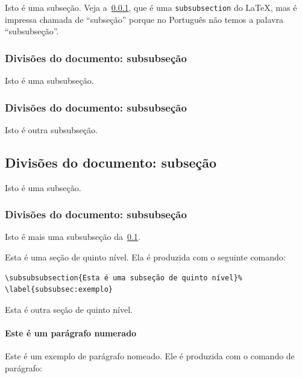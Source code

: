 Isto é uma subseção. Veja a~\cref{subsubsec:divisoes}, que é uma
\texttt{subsubsection} do \LaTeX, mas é impressa chamada de ``subseção'' porque
no Português não temos a palavra ``subsubseção''.

\subsubsection{Divisões do documento: subsubseção}%
\label{subsubsec:divisoes}

Isto é uma subsubseção.

\subsubsection{Divisões do documento: subsubseção}

Isto é outra subsubseção.

\subsection{Divisões do documento: subseção}%
\label{subsec:exemplo}

Isto é uma subseção.

\subsubsection{Divisões do documento: subsubseção}

Isto é mais uma subsubseção da~\cref{subsec:exemplo}.

%
\label{subsubsec:exemplo}

Esta é uma seção de quinto nível. Ela é produzida com o seguinte comando:

\begin{verbatim}
\subsubsubsection{Esta é uma subseção de quinto nível}%
\label{subsubsec:exemplo}
\end{verbatim}

%
\label{subsubsubsec:exemplo}

Esta é outra seção de quinto nível.

\paragraph{Este é um parágrafo numerado}%
\label{par:exemplo-paragrafo}

Este é um exemplo de parágrafo nomeado. Ele é produzida com o comando de
parágrafo:

